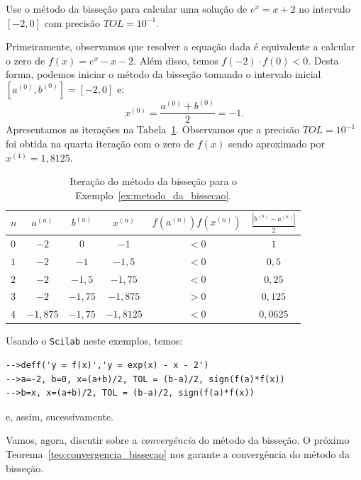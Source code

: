 \begin{ex}\label{ex:metodo_da_bissecao}Use o método da bisseção para calcular uma solução de $e^x = x + 2$ no intervalo $[-2, 0]$ com precisão $TOL = 10^{-1}$.
  \begin{sol}
    Primeiramente, observamos que resolver a equação dada é equivalente a calcular o zero de $f(x) = e^x - x - 2$. Além disso, temos $f(-2)\cdot f(0) < 0$. Desta forma, podemos iniciar o método da bisseção tomando o intervalo inicial $[a^{(0)}, b^{(0)}] = [-2, 0]$ e:
    \begin{equation*}
      x^{(0)} = \frac{a^{(0)} + b^{(0)}}{2} = -1.
    \end{equation*}
Apresentamos as iterações na Tabela~\ref{tab:metodo_da_bissecao}. Observamos que a precisão $TOL = 10^{-1}$ foi obtida na quarta iteração com o zero de $f(x)$ sendo aproximado por $x^{(4)} = 1,8125$.
    \begin{table}
      \centering
      \begin{tabular}{l|ccc|c|c}\hline
        $n$ & $a^{(n)}$ & $b^{(n)}$ & $x^{(n)}$ & $f(a^{(n)})f(x^{(n)})$ & $\displaystyle \frac{|b^{(n)}-a^{(n)}|}{2}$\\\hline
        $0$ & $-2$ & $0$ & $-1$ & $< 0$ & $1$\\
        $1$ & $-2$ & $-1$ & $-1,5$ & $<0$ & $0,5$\\
        $2$ & $-2$ & $-1,5$ & $-1,75$ & $<0$ & $0,25$\\
        $3$ & $-2$ & $-1,75$ & $-1,875$ & $>0$ & $0,125$\\
        $4$ & $-1,875$ & $-1,75$ & $-1,8125$ & $<0$ & $0,0625$\\\hline
      \end{tabular}
      \caption{Iteração do método da bisseção para o Exemplo~\ref{ex:metodo_da_bissecao}.}
      \label{tab:metodo_da_bissecao}
    \end{table}

\ifisscilab
Usando o \verb+Scilab+ neste exemplos, temos:
\begin{verbatim}
-->deff('y = f(x)','y = exp(x) - x - 2')
-->a=-2, b=0, x=(a+b)/2, TOL = (b-a)/2, sign(f(a)*f(x))
-->b=x, x=(a+b)/2, TOL = (b-a)/2, sign(f(a)*f(x))
\end{verbatim}
e, assim, sucessivamente.
\fi    
  \end{sol}
\end{ex}

Vamos, agora, discutir sobre a \emph{convergência} do método da bisseção. O próximo Teorema~\ref{teo:convergencia_bissecao} nos garante a convergência do método da bisseção.

